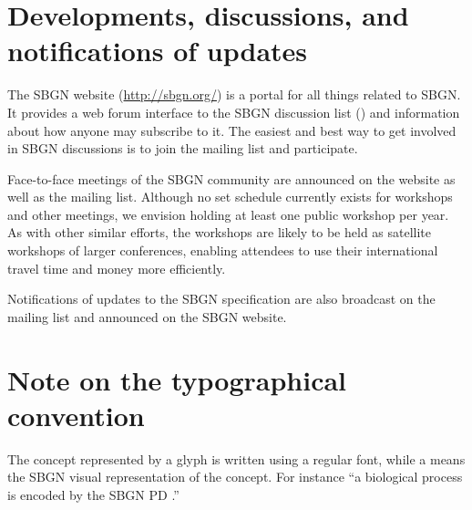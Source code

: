 \section{Developments, discussions, and notifications of updates}
\label{sec:discussions}

The SBGN website (\url{http://sbgn.org/}) is a portal for all things 
related to SBGN.  It provides a web forum interface to the SBGN discussion 
list () and information about how anyone 
may subscribe to it.  The easiest and best way to get involved in SBGN 
discussions is to join the mailing list and participate.

Face-to-face meetings of the SBGN community are announced on the website as 
well as the mailing list.  Although no set schedule currently exists for 
workshops and other meetings, we envision holding at least one public 
workshop per year.  As with other similar efforts, the workshops are likely 
to be held as satellite workshops of larger conferences, enabling attendees 
to use their international travel time and money more efficiently.

Notifications of updates to the SBGN specification are also broadcast on 
the mailing list and announced on the SBGN website.

\section{Note on the typographical convention}
The concept represented by a glyph is written using a regular font, while a 
 means the SBGN visual representation of the concept. For 
instance ``a biological process is encoded by the SBGN PD .''

